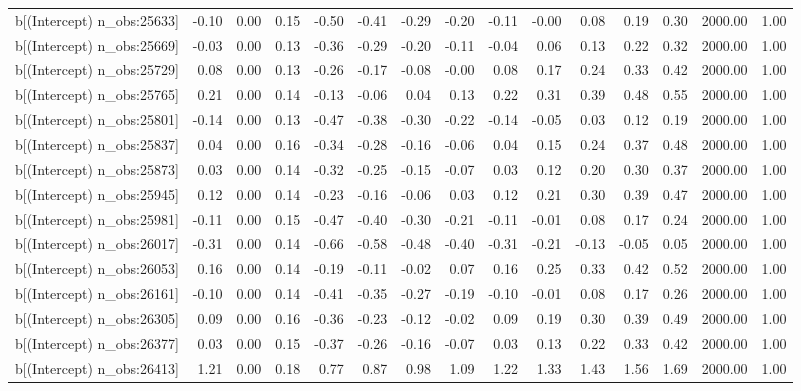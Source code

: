 \begin{table}[ht]
\begin{tabular}{rrrrrrrrrrrrrrr}
  b[(Intercept) n\_obs:25633] & -0.10 & 0.00 & 0.15 & -0.50 & -0.41 & -0.29 & -0.20 & -0.11 & -0.00 & 0.08 & 0.19 & 0.30 & 2000.00 & 1.00 \\ 
  b[(Intercept) n\_obs:25669] & -0.03 & 0.00 & 0.13 & -0.36 & -0.29 & -0.20 & -0.11 & -0.04 & 0.06 & 0.13 & 0.22 & 0.32 & 2000.00 & 1.00 \\ 
  b[(Intercept) n\_obs:25729] & 0.08 & 0.00 & 0.13 & -0.26 & -0.17 & -0.08 & -0.00 & 0.08 & 0.17 & 0.24 & 0.33 & 0.42 & 2000.00 & 1.00 \\ 
  b[(Intercept) n\_obs:25765] & 0.21 & 0.00 & 0.14 & -0.13 & -0.06 & 0.04 & 0.13 & 0.22 & 0.31 & 0.39 & 0.48 & 0.55 & 2000.00 & 1.00 \\ 
  b[(Intercept) n\_obs:25801] & -0.14 & 0.00 & 0.13 & -0.47 & -0.38 & -0.30 & -0.22 & -0.14 & -0.05 & 0.03 & 0.12 & 0.19 & 2000.00 & 1.00 \\ 
  b[(Intercept) n\_obs:25837] & 0.04 & 0.00 & 0.16 & -0.34 & -0.28 & -0.16 & -0.06 & 0.04 & 0.15 & 0.24 & 0.37 & 0.48 & 2000.00 & 1.00 \\ 
  b[(Intercept) n\_obs:25873] & 0.03 & 0.00 & 0.14 & -0.32 & -0.25 & -0.15 & -0.07 & 0.03 & 0.12 & 0.20 & 0.30 & 0.37 & 2000.00 & 1.00 \\ 
  b[(Intercept) n\_obs:25945] & 0.12 & 0.00 & 0.14 & -0.23 & -0.16 & -0.06 & 0.03 & 0.12 & 0.21 & 0.30 & 0.39 & 0.47 & 2000.00 & 1.00 \\ 
  b[(Intercept) n\_obs:25981] & -0.11 & 0.00 & 0.15 & -0.47 & -0.40 & -0.30 & -0.21 & -0.11 & -0.01 & 0.08 & 0.17 & 0.24 & 2000.00 & 1.00 \\ 
  b[(Intercept) n\_obs:26017] & -0.31 & 0.00 & 0.14 & -0.66 & -0.58 & -0.48 & -0.40 & -0.31 & -0.21 & -0.13 & -0.05 & 0.05 & 2000.00 & 1.00 \\ 
  b[(Intercept) n\_obs:26053] & 0.16 & 0.00 & 0.14 & -0.19 & -0.11 & -0.02 & 0.07 & 0.16 & 0.25 & 0.33 & 0.42 & 0.52 & 2000.00 & 1.00 \\ 
  b[(Intercept) n\_obs:26161] & -0.10 & 0.00 & 0.14 & -0.41 & -0.35 & -0.27 & -0.19 & -0.10 & -0.01 & 0.08 & 0.17 & 0.26 & 2000.00 & 1.00 \\ 
  b[(Intercept) n\_obs:26305] & 0.09 & 0.00 & 0.16 & -0.36 & -0.23 & -0.12 & -0.02 & 0.09 & 0.19 & 0.30 & 0.39 & 0.49 & 2000.00 & 1.00 \\ 
  b[(Intercept) n\_obs:26377] & 0.03 & 0.00 & 0.15 & -0.37 & -0.26 & -0.16 & -0.07 & 0.03 & 0.13 & 0.22 & 0.33 & 0.42 & 2000.00 & 1.00 \\ 
  b[(Intercept) n\_obs:26413] & 1.21 & 0.00 & 0.18 & 0.77 & 0.87 & 0.98 & 1.09 & 1.22 & 1.33 & 1.43 & 1.56 & 1.69 & 2000.00 & 1.00 \\ 

\end{tabular}
\end{table}
